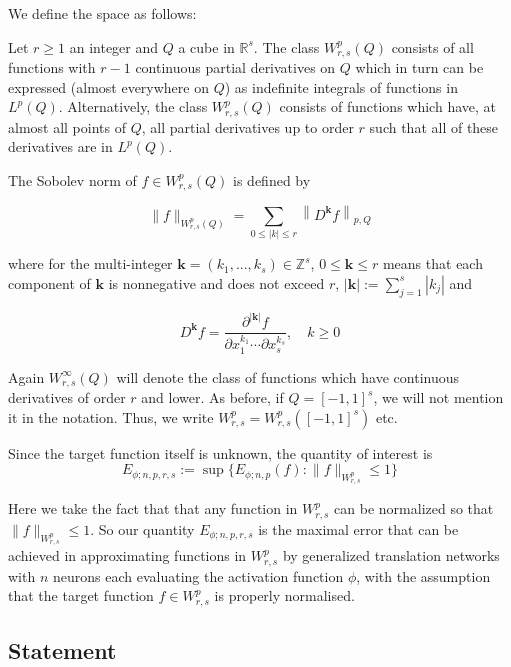 \documentclass{article}
\begin{document}
\begin{itemize}
We define the space as follows: 

Let \(r \geq 1\) an integer and \(Q\) a cube in \(\mathbb{R}^{s}\). The class \(W^p_{r,s}(Q)\) consists of all functions with \(r - 1\) continuous partial derivatives on \(Q\) which in turn can be expressed (almost everywhere on \(Q\)) as indefinite integrals of functions in \(L^p(Q)\). Alternatively, the class \(W^p_{r,s}(Q)\) consists of functions which have, at almost all points of \(Q\), all partial derivatives up to order \(r\) such that all of these derivatives are in \(L^p(Q)\). 

The Sobolev norm of \(f \in W^p_{r,s}(Q)\) is defined by 

\[
\|f\|_{W^p_{r,s}(Q)} = \sum_{0\leq |k| \leq r}  \left\lVert D^{\mathbf{k}} f\right\rVert_{p,Q}   
\]

where for the multi-integer \( \mathbf{k}  = (k_1,...,k_s) \in \mathbb{Z}^s \), \( 0 \leq \mathbf{k}  \leq r \) means that each component of \( \mathbf{k}  \) is nonnegative and does not exceed \( r \), \( |\mathbf{k} | := \sum_{j=1}^{s} |k_j| \) and 

\[
    D^{\mathbf{k} }f = \frac{\partial^{|\mathbf{k} |} f}{\partial x_1^{k_1} \cdots \partial x_s^{k_s}}, \quad k \geq 0
\]

Again \(W^{\infty }_{r,s}(Q)\) will denote the class of functions which have continuous derivatives of order \(r\) and lower. As before, if \(Q = [-1, 1]^s\), we will not mention it in the notation. Thus, we write \(W^p_{r,s} = W^p_{r,s}([-1, 1]^s)\) etc.

Since the target function itself is unknown, the quantity of interest is
\[
    E_{\phi ; n,p,r,s} := \sup\{E_{\phi ; n,p}(f) : \|f\|_{W^p_{r,s}} \leq 1\}
\]

Here we take the fact that that any function in \(W^p_{r,s}\) can be normalized so that \( \|f\|_{W^p_{r,s}} \leq 1 \). So our quantity \(E_{\phi ; n,p,r,s}\) is the maximal error that can be achieved in approximating functions in \(W^p_{r,s}\) by generalized translation networks with \(n\) neurons each evaluating the activation function \(\phi \), with the assumption that the target function \(f \in W^p_{r,s}\) is properly normalised.


\end{itemize}

\subsection{Statement}
\end{document}

